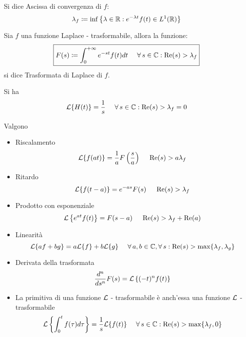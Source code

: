 \begin{defn}
Si dice Ascissa di convergenza di $\displaystyle f$:
\begin{equation*}
\lambda _{f} \coloneqq \inf\left\{\lambda \in \mathbb{R}  :e^{ - \lambda t} f(t) \in L^{1}(\mathbb{R})\right\}
\end{equation*}
\end{defn}
\begin{defn}
Sia $\displaystyle f$ una funzione Laplace - trasformabile, allora la funzione:
\begin{equation*}
\boxed{F(s) \coloneqq \int ^{ + \infty }_{0} e^{ - st} f(t) dt\ \ \ \ \forall s\in \CC  :\Re (s)  > \lambda _{f}}
\end{equation*}
si dice Trasformata di Laplace di $\displaystyle f$.
\end{defn}
\begin{rem}
 Si ha
\begin{equation*}
\Lc\{H(t)\} = \frac{1}{s} \ \ \ \ \forall s\in \CC  :\Re (s)  > \lambda _{f} = 0
\end{equation*}
\end{rem}
\begin{thm}
[Proprietà] Valgono
\begin{itemize}
\item Riscalamento\begin{equation*}
\mathcal{L}\{f(at)\} = \frac{1}{a} F\left(\frac{s}{a}\right) \ \ \ \ \operatorname{Re} (s)  > a\lambda _{f}
\end{equation*}
\item Ritardo\begin{equation*}
\mathcal{L}\{f(t - a)\} = e^{ - as} F(s) \ \ \ \ \operatorname{Re} (s)  > \lambda _{f}
\end{equation*}
\item Prodotto con esponenziale\begin{equation*}
\Lc\left\{e^{at} f(t)\right\} = F(s - a) \ \ \ \ \Re (s)  > \lambda _{f} + \Re (a)
\end{equation*}
\item Linearità\begin{equation*}
\Lc\{af + bg\} = a\Lc\{f\} + b\Lc\{g\} \ \ \ \ \forall a,b\in \CC  ,\forall s:\Re (s)  > \max\{\lambda _{f} ,\lambda _{g}\}
\end{equation*}
\item Derivata della trasformata\begin{equation*}
\frac{d^{n}}{ds^{n}} F(s) = \mathcal{L}\left\{(- t)^{n} f(t)\right\}
\end{equation*}
\item La primitiva di una funzione $\mathcal{L}$ - trasformabile è anch'essa una funzione $\mathcal{L}$ - trasformabile\begin{equation*}
\Lc\left\{\int ^{t}_{0} f(\tau) d\tau \right\} = \frac{1}{s}\Lc\{f(t)\} \ \ \ \ \forall s\in \CC  :\Re (s)  > \max\{\lambda _{f} ,0\}
\end{equation*}
\end{itemize}
\end{thm}
